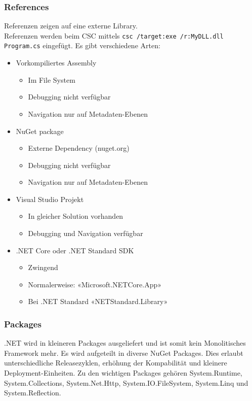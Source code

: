 \documentclass[
a4paper,
oneside,
10pt,
fleqn,
headsepline,
toc=listofnumbered, 
bibliography=totocnumbered]{scrartcl}
\begin{document}
\subsubsection{References}
Referenzen zeigen auf eine externe Library. \\
Referenzen werden beim CSC mittels \lstinline|csc /target:exe /r:MyDLL.dll Program.cs| eingefügt. Es gibt verschiedene Arten:
\begin{itemize}
	\item Vorkompiliertes Assembly
	      \begin{itemize}
		      \item Im File System
		      \item Debugging nicht verfügbar
		      \item Navigation nur auf Metadaten-Ebenen
	      \end{itemize}
	\item NuGet package
	      \begin{itemize}
		      \item Externe Dependency (nuget.org)
		      \item Debugging nicht verfügbar
		      \item Navigation nur auf Metadaten-Ebenen
	      \end{itemize}
	\item Visual Studio Projekt
	      \begin{itemize}
		      \item In gleicher Solution vorhanden
		      \item Debugging und Navigation verfügbar
	      \end{itemize}
	\item .NET Core oder .NET Standard SDK
	      \begin{itemize}
		      \item Zwingend
		      \item Normalerweise: «Microsoft.NETCore.App»
		      \item Bei .NET Standard «NETStandard.Library»
	      \end{itemize}
\end{itemize}

\subsubsection{Packages}
.NET wird in kleineren Packages ausgeliefert und ist somit kein Monolitisches Framework mehr. Es wird aufgeteilt in diverse NuGet Packages. Dies erlaubt unterschiedliche Releasezyklen, erhöhung der Kompabilität und kleinere Deployment-Einheiten. Zu den wichtigen Packages gehören System.Runtime, System.Collections, System.Net.Http, System.IO.FileSystem, System.Linq und System.Reflection.
\end{document}
